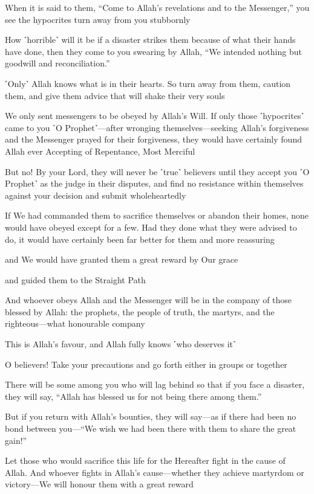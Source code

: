 When it is said to them, “Come to Allah’s revelations and to the Messenger,” you see the hypocrites turn away from you stubbornly

How ˹horrible˺ will it be if a disaster strikes them because of what their hands have done, then they come to you swearing by Allah, “We intended nothing but goodwill and reconciliation.”

˹Only˺ Allah knows what is in their hearts. So turn away from them, caution them, and give them advice that will shake their very souls

We only sent messengers to be obeyed by Allah’s Will. If only those ˹hypocrites˺ came to you ˹O Prophet˺—after wronging themselves—seeking Allah’s forgiveness and the Messenger prayed for their forgiveness, they would have certainly found Allah ever Accepting of Repentance, Most Merciful

But no! By your Lord, they will never be ˹true˺ believers until they accept you ˹O Prophet˺ as the judge in their disputes, and find no resistance within themselves against your decision and submit wholeheartedly

If We had commanded them to sacrifice themselves or abandon their homes, none would have obeyed except for a few. Had they done what they were advised to do, it would have certainly been far better for them and more reassuring

and We would have granted them a great reward by Our grace

and guided them to the Straight Path

And whoever obeys Allah and the Messenger will be in the company of those blessed by Allah: the prophets, the people of truth, the martyrs, and the righteous—what honourable company

This is Allah’s favour, and Allah fully knows ˹who deserves it˺

O believers! Take your precautions and go forth either in groups or together

There will be some among you who will lag behind so that if you face a disaster, they will say, “Allah has blessed us for not being there among them.”

But if you return with Allah’s bounties, they will say—as if there had been no bond between you—“We wish we had been there with them to share the great gain!”

Let those who would sacrifice this life for the Hereafter fight in the cause of Allah. And whoever fights in Allah’s cause—whether they achieve martyrdom or victory—We will honour them with a great reward

